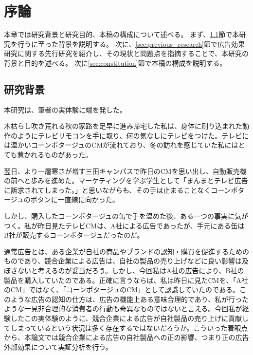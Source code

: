 \documentclass[11pt]{jsarticle}
\begin{document}
\newpage

 \setcounter{tocdepth}{3}

\tableofcontents

\newpage
{}
 \setcounter{tocdepth}{3}



\section{序論}
\label{ch:introduction}
本章では研究背景と研究目的、本稿の構成について述べる。
まず、\ref{sec:background}節で本研究を行うに至った背景を説明する。
次に、\ref{sec:previous_research}節で広告効果研究に関する先行研究を紹介し、その現状と問題点を指摘することで、本研究の背景と目的を述べる。
次に\ref{sec:constitution}節で本稿の構成を説明する。

\subsection{研究背景}
 \label{sec:background}
 本研究は、筆者の実体験に端を発した。
 
木枯らし吹き荒れる秋の家路を足早に進み帰宅した私は、身体に刷り込まれた動作のようにテレビリモコンを手に取り、何の気なしにテレビをつけた。テレビには温かいコーンポタージュのCMが流れており、冬の訪れを感じていた私にはとても惹かれるものがあった。

翌日、より一層寒さが増す三田キャンパスで昨日のCMを思い出し、自動販売機の前へと歩みを進めた。マーケティングを学ぶ学生として「まんまとテレビ広告に訴求されてしまった。」と思いながらも、その手は止まることなくコーンポタージュのボタンに一直線に向かった。

しかし、購入したコーンポタージュの缶で手を温めた後、ある一つの事実に気がつく。私が昨日見たテレビCMは、A社による広告であったが、手元にある缶はB社が販売するコーンポタージュだったのだ。

通常広告とは、ある企業が自社の商品やブランドの認知・購買を促進するためのものであり、競合企業による広告は、自社の製品の売り上げなどに良い影響は及ぼさないと考えるのが妥当だろう。しかし、今回私はA社の広告により、B社の製品を購入していたのである。正確に言うならば、私は昨日に見たCMを、「A社のCM」ではなく、「コーンポタージュのCM」として認識していたのである。このような広告の認知の仕方は、広告の機能上ある意味合理的であり、私が行ったような一見非合理的な消費者の行動も奇異なものではないと言える。今回私が経験したこの実体験のように、競合企業による広告が自社製品の売り上げに貢献してしまっているという状況は多く存在するではないだろうか。こういった着眼点から、本論文では競合企業による広告の自社製品への正の影響、つまり正の広告外部効果について実証分析を行う。
\end{document}

